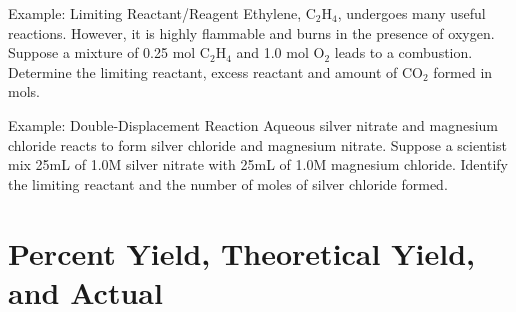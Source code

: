 \documentclass[11pt]{beamer}
\begin{document}
\begin{frame}{Example: Limiting Reactant/Reagent}
  Ethylene, C$_2$H$_4$, undergoes many useful reactions. However,
  it is highly flammable and burns in the presence of oxygen. Suppose
  a mixture of 0.25 mol C$_2$H$_4$ and 1.0 mol O$_2$ leads to a combustion.
  Determine the limiting reactant, excess reactant and amount of CO$_2$
  formed in mols.
  
  \vfill
\end{frame}

\begin{frame}{Example: Double-Displacement Reaction}
  Aqueous silver nitrate and magnesium chloride reacts to
  form silver chloride and magnesium nitrate. Suppose
  a scientist mix 25mL of 1.0M silver nitrate with 25mL of 1.0M magnesium chloride.
  Identify the limiting reactant and the number of moles of silver chloride formed.
  
  \vfill
\end{frame}

\section{Percent Yield, Theoretical Yield, and Actual}
\end{document}
